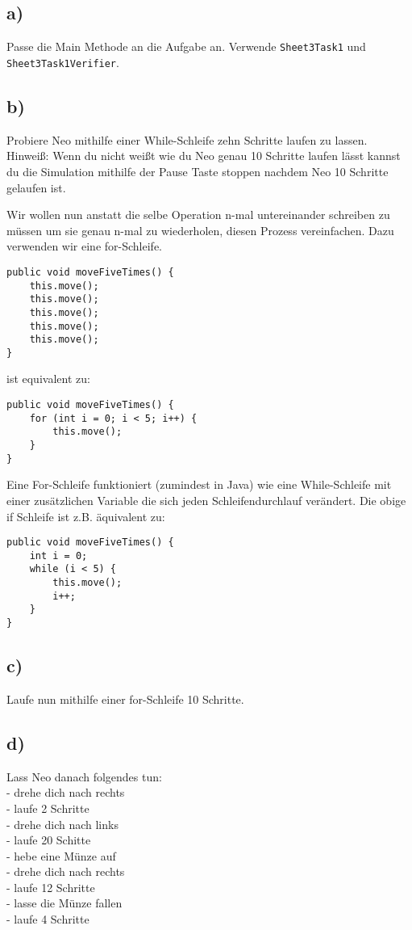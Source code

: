 \subsection*{a)}
	Passe die Main Methode an die Aufgabe an. Verwende \lstinline{Sheet3Task1} und \lstinline{Sheet3Task1Verifier}.
\subsection*{b)}
	Probiere Neo mithilfe einer While-Schleife zehn Schritte laufen zu lassen.\\
	Hinweiß: Wenn du nicht weißt wie du Neo genau 10 Schritte laufen lässt kannst du die Simulation mithilfe der Pause Taste stoppen nachdem Neo 10 Schritte gelaufen ist.

\begin{Infobox}
		Wir wollen nun anstatt die selbe Operation n-mal untereinander schreiben zu müssen um sie genau n-mal zu wiederholen, diesen Prozess vereinfachen.
		Dazu verwenden wir eine for-Schleife. 
		\begin{lstlisting}
public void moveFiveTimes() {
	this.move();
	this.move();
	this.move();
	this.move();
	this.move();
}
		\end{lstlisting}
		ist equivalent zu:
		\begin{lstlisting}
public void moveFiveTimes() {
	for (int i = 0; i < 5; i++) {
		this.move();
	}
}
		\end{lstlisting}
Eine For-Schleife funktioniert (zumindest in Java) wie eine While-Schleife mit einer zusätzlichen Variable die sich jeden Schleifendurchlauf verändert.
Die obige if Schleife ist z.B. äquivalent zu:
		\begin{lstlisting}
public void moveFiveTimes() {
	int i = 0;
	while (i < 5) {
		this.move();
		i++;
	}
}
		\end{lstlisting}
 \end{Infobox}

\subsection*{c)}
Laufe nun mithilfe einer for-Schleife 10 Schritte.

\subsection*{d)}
Lass Neo danach folgendes tun:\\
	- drehe dich nach rechts\\
	- laufe 2 Schritte\\
	- drehe dich nach links\\ 
	- laufe 20 Schitte\\
	- hebe eine Münze auf\\
	- drehe dich nach rechts\\
	- laufe 12 Schritte\\
	- lasse die Münze fallen\\
	- laufe 4 Schritte

